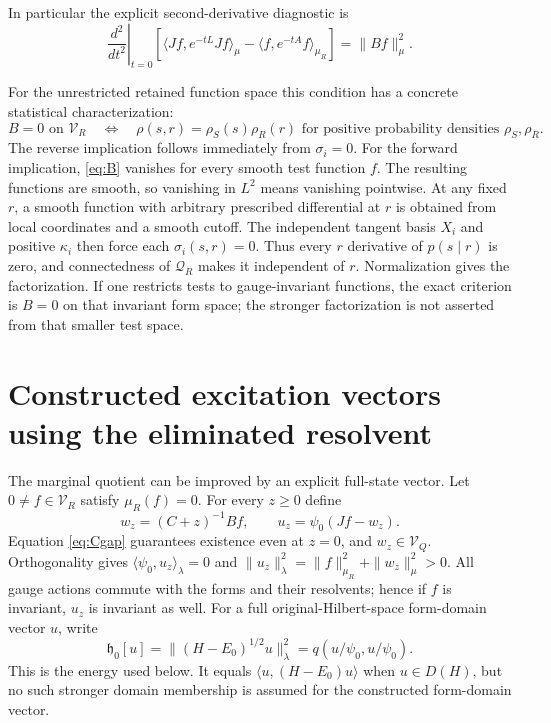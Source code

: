 \documentclass[11pt]{article}
\begin{document}
In particular the explicit second-derivative diagnostic is
\[
 \left.\frac{d^2}{dt^2}\right|_{t=0}
 \left[\langle Jf,e^{-tL}Jf\rangle_\mu
              -\langle f,e^{-tA}f\rangle_{\mu_R}\right]=\|Bf\|_\mu^2.
\]

For the unrestricted retained function space this condition has a
concrete statistical characterization:
\begin{equation}\label{eq:factorization}
 B=0\text{ on }\mathcal V_R
 \quad\Longleftrightarrow\quad
 \rho(s,r)=\rho_S(s)\rho_R(r)
 \text{ for positive probability densities }\rho_S,\rho_R.
\end{equation}
The reverse implication follows immediately from $\sigma_i=0$.
For the forward implication, \eqref{eq:B} vanishes for every smooth
test function $f$. The resulting functions are smooth, so vanishing
in $L^2$ means vanishing pointwise. At any fixed $r$, a smooth function
with arbitrary prescribed differential at $r$ is obtained from local
coordinates and a smooth cutoff. The independent tangent basis $X_i$
and positive $\kappa_i$ then force each $\sigma_i(s,r)=0$. Thus every
$r$ derivative of $p(s\mid r)$ is zero, and connectedness of
$\mathcal Q_R$ makes it independent of $r$. Normalization gives the
factorization. If one restricts tests to gauge-invariant functions,
the exact criterion is $B=0$ on that invariant form space; the stronger
factorization is not asserted from that smaller test space.

\section{Constructed excitation vectors using the eliminated resolvent}

The marginal quotient can be improved by an explicit full-state vector.
Let $0\ne f\in\mathcal V_R$ satisfy $\mu_R(f)=0$. For every $z\geq0$
define
\begin{equation}\label{eq:correctedstate}
 w_z=(C+z)^{-1}Bf,\qquad
 u_z=\psi_0(Jf-w_z).
\end{equation}
Equation \eqref{eq:Cgap} guarantees existence even at $z=0$, and
$w_z\in\mathcal V_Q$. Orthogonality gives
$\langle\psi_0,u_z\rangle_\lambda=0$ and
$\|u_z\|_\lambda^2=\|f\|_{\mu_R}^2+\|w_z\|_\mu^2>0$.
All gauge actions commute with the forms and their resolvents; hence
if $f$ is invariant, $u_z$ is invariant as well.
For a full original-Hilbert-space form-domain vector $u$, write
\[
 \mathfrak h_0[u]=\|(H-E_0)^{1/2}u\|_\lambda^2
                =q(u/\psi_0,u/\psi_0).
\]
This is the energy used below. It equals
$\langle u,(H-E_0)u\rangle$ when $u\in D(H)$, but no such stronger
domain membership is assumed for the constructed form-domain vector.
\end{document}
